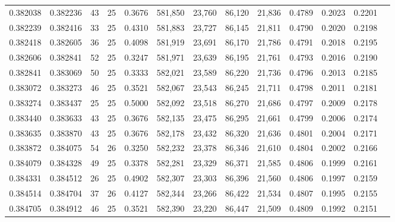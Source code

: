 \begin{tabular}{rrrrrrrrrrrrr}
0.382038 & 0.382236 &    43 &  25 &                                     0.3676 & 581,850 &  23,760 &  86,120 &  21,836 & 0.4789 & 0.2023 & 0.2201 \\
0.382239 & 0.382416 &    33 &  25 &                                     0.4310 & 581,883 &  23,727 &  86,145 &  21,811 & 0.4790 & 0.2020 & 0.2198 \\
0.382418 & 0.382605 &    36 &  25 &                                     0.4098 & 581,919 &  23,691 &  86,170 &  21,786 & 0.4791 & 0.2018 & 0.2195 \\
0.382606 & 0.382841 &    52 &  25 &                                     0.3247 & 581,971 &  23,639 &  86,195 &  21,761 & 0.4793 & 0.2016 & 0.2190 \\
0.382841 & 0.383069 &    50 &  25 &                                     0.3333 & 582,021 &  23,589 &  86,220 &  21,736 & 0.4796 & 0.2013 & 0.2185 \\
0.383072 & 0.383273 &    46 &  25 &                                     0.3521 & 582,067 &  23,543 &  86,245 &  21,711 & 0.4798 & 0.2011 & 0.2181 \\
0.383274 & 0.383437 &    25 &  25 &                                     0.5000 & 582,092 &  23,518 &  86,270 &  21,686 & 0.4797 & 0.2009 & 0.2178 \\
0.383440 & 0.383633 &    43 &  25 &                                     0.3676 & 582,135 &  23,475 &  86,295 &  21,661 & 0.4799 & 0.2006 & 0.2174 \\
0.383635 & 0.383870 &    43 &  25 &                                     0.3676 & 582,178 &  23,432 &  86,320 &  21,636 & 0.4801 & 0.2004 & 0.2171 \\
0.383872 & 0.384075 &    54 &  26 &                                     0.3250 & 582,232 &  23,378 &  86,346 &  21,610 & 0.4804 & 0.2002 & 0.2166 \\
0.384079 & 0.384328 &    49 &  25 &                                     0.3378 & 582,281 &  23,329 &  86,371 &  21,585 & 0.4806 & 0.1999 & 0.2161 \\
0.384331 & 0.384512 &    26 &  25 &                                     0.4902 & 582,307 &  23,303 &  86,396 &  21,560 & 0.4806 & 0.1997 & 0.2159 \\
0.384514 & 0.384704 &    37 &  26 &                                     0.4127 & 582,344 &  23,266 &  86,422 &  21,534 & 0.4807 & 0.1995 & 0.2155 \\
0.384705 & 0.384912 &    46 &  25 &                                     0.3521 & 582,390 &  23,220 &  86,447 &  21,509 & 0.4809 & 0.1992 & 0.2151 \\

\end{tabular}
